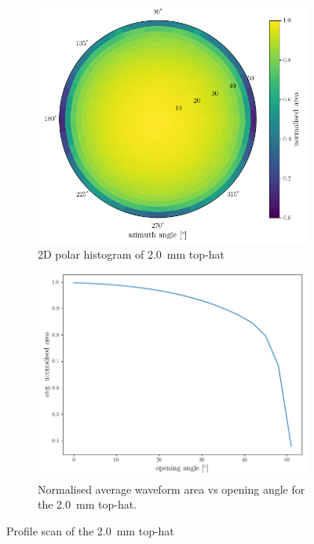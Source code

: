 \documentclass[a4paper,11pt]{article}
\begin{document}
\begin{figure}[h]
  \centering
  \begin{subfigure}[b]{0.45\textwidth}
    \includegraphics[width=\linewidth]{2mm_tophat_profile.png}
    \caption{2D polar histogram of 2.0~mm top-hat}
    \label{fig:2mm top hat profile polar}
  \end{subfigure}
  \hfill
  \begin{subfigure}[b]{0.45\textwidth}
    \includegraphics[width=\linewidth]{2mm_tophat_radial.png}
    \caption{Normalised average waveform area vs opening angle for the 2.0~mm top-hat.}
    \label{fig:2mm top hat radial}
  \end{subfigure}
  \caption{Profile scan of the 2.0~mm top-hat}
  \label{fig:2mm top hat profile}
\end{figure}
\end{document}
